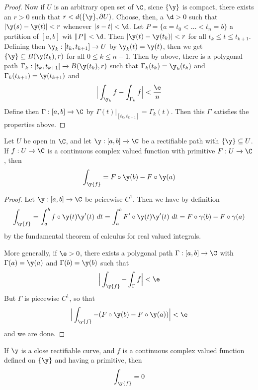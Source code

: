 \begin{proof}
    Now if $U$ is an arbitrary open set of  $\C$, sicne  $\{\y\}$ is compact,
    there exists an $r>0$ such that $r<d(\{\y\},\partial{U})$. Choose, then, a
    $\d>0$ such that  $|\y(s)-\y(t)|<r$ whenever $|s-t|<\d$. Let
    $P=\{a=t_0<\dots<t_n=b\}$ a partition of $[a,b]$ wit $\|P\|<\d$. Then
    $|\y(t)-\y(t_k)|<r$ for all $t_k \leq t \leq t_{k+1}$. Defining then
    $\y_k:[t_k,t_{k+1}] \xrightarrow{} U$ by $\y_k(t)=\y(t)$, then we get
    $\{\y\} \subseteq B(\y(t_k),r)$ for all $0 \leq k \leq n-1$. Then by above,
    there is a polygonal path $\Gamma_k:[t_k,t_{k+1}] \xrightarrow{}
    B(\y(t_k),r)$ such that $\Gamma_k(t_k)=\y_k(t_k)$ and
    $\Gamma_k(t_{k+1})=\y(t_{k+1})$ and
    \begin{equation*}
        \Big{|} \int_{\y_k}{f}-\int_{\Gamma_k}{f} \Big{|}<\frac{\e}{n}
    \end{equation*}
    Define then $\Gamma:[a,b] \xrightarrow{} \C$ by
    $\Gamma(t)|_{[t_k,t_{k+1}]}=\Gamma_k(t)$. Then this $\Gamma$ satisfies the
    properties above.
\end{proof}

\begin{theorem}\label{4.2.5}
    Let $U$ be open in $\C$, and let $\y:[a,b] \xrightarrow{} \C$ be a
    rectifiable path with $\{\y\} \subseteq U$. If $f:U \xrightarrow{} \C$ is a
    continuous complex valued function with primitive $F:U \xrightarrow{} \C$,
    then
    \begin{equation*}
        \int_\y{f}=F \circ \y(b)-F \circ \y(a)
    \end{equation*}
\end{theorem}
\begin{proof}
    Let $\y:[a,b] \xrightarrow{} \C$ be peicewise $C^1$. Then we have by
    definition
    \begin{equation*}
        \int_\y{f}=\int_a^b{f \circ \y(t)\y'(t) \ dt}=
        \int_a^b{F' \circ \y(t)\y'(t) \ dt}=F \circ \gamma(b)-F \circ \gamma(a)
    \end{equation*}
    by the fundamental theorem of calculus for real valued integrals.

    More generally, if $\e>0$, there exists a polygonal path  $\Gamma:[a,b]
    \xrightarrow{} \C$ with $\Gamma(a)=\y(a)$ and $\Gamma(b)=\y(b)$ such that
    \begin{equation*}
        \Big{|} \int_\y{f}-\int_\Gamma{f} \Big{|}<\e
    \end{equation*}
    But $\Gamma$ is piecewise  $C^1$, so that
    \begin{equation*}
        \Big{|} \int_\y{f}-(F \circ \y(b)-F \circ \y(a)) \Big{|}<\e
    \end{equation*}
    and we are done.
\end{proof}
\begin{corollary}
    If $\y$ is a close rectifiable curve, and $f$ is a continuous complex valued
    function defined on $\{\y\}$ and having a primitive, then
    \begin{equation*}
        \int_\y{f}=0
    \end{equation*}
\end{corollary}
